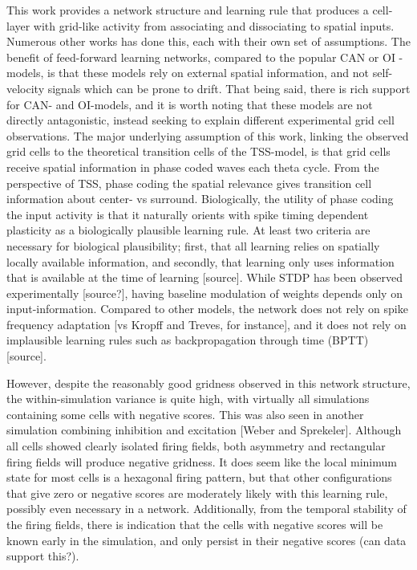 \documentclass{article}
\begin{document}
    This work provides a network structure and learning rule that produces a cell-layer with grid-like activity from associating and dissociating to spatial inputs. Numerous other works has done this, each with their own set of assumptions. The benefit of feed-forward learning networks, compared to the popular CAN or OI -models, is that these models rely on external spatial information, and not self-velocity signals which can be prone to drift. That being said, there is rich support for CAN- and OI-models, and it is worth noting that these models are not directly antagonistic, instead seeking to explain different experimental grid cell observations.
    The major underlying assumption of this work, linking the observed grid cells to the theoretical transition cells of the TSS-model, is that grid cells receive spatial information in phase coded waves each theta cycle. From the perspective of TSS, phase coding the spatial relevance gives transition cell information about center- vs surround. Biologically, the utility of phase coding the input activity is that it naturally orients with spike timing dependent plasticity as a biologically plausible learning rule. At least two criteria are necessary for biological plausibility; first, that all learning relies on spatially locally available information, and secondly, that learning only uses information that is available at the time of learning [source]. While STDP has been observed experimentally [source?], having baseline modulation of weights depends only on input-information.  Compared to other models, the network does not rely on spike frequency adaptation [vs Kropff and Treves, for instance], and it does not rely on implausible learning rules such as backpropagation through time (BPTT) [source].

    However, despite the reasonably good gridness observed in this network structure, the within-simulation variance is quite high, with virtually all simulations containing some cells with negative scores. This was also seen in another simulation combining inhibition and excitation [Weber and Sprekeler]. Although all cells showed clearly isolated firing fields, both asymmetry and rectangular firing fields will produce negative gridness. It does seem like the local minimum state for most cells is a hexagonal firing pattern, but that other configurations that give zero or negative scores are moderately likely with this learning rule, possibly even necessary in a network. Additionally, from the temporal stability of the firing fields, there is indication that the cells with negative scores will be known early in the simulation, and only persist in their negative scores (can data support this?).
\end{document}
